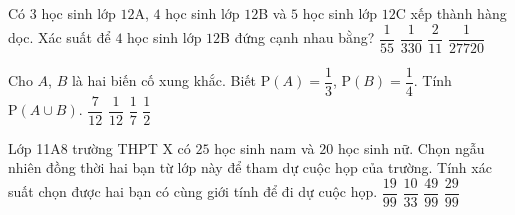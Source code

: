 \begin{ex}%
	Có $ 3 $ học sinh lớp $ 12 $A, $ 4 $ học sinh lớp $ 12 $B và $ 5 $ học  sinh lớp $ 12 $C xếp thành hàng dọc. Xác suất để $ 4 $ học sinh lớp $ 12 $B đứng cạnh nhau bằng?
	\choice 
		{\True  $ \dfrac{1}{55} $}
		{$  \dfrac{1}{330} $}
		 {$ \dfrac{2}{11} $}
		 {$ \dfrac{1}{ 27720 } $}
\end{ex}

\begin{ex}%
	Cho $A$, $B$ là hai biến cố xung khắc.  Biết $\mathrm{P}(A)=\dfrac{1}{3}$, $\mathrm{P}(B)=\dfrac{1}{4}$. Tính $\mathrm{P}(A\cup B)$.
	 \choice
		{\True  $\dfrac{7}{12}$}
		{$\dfrac{1}{12}$} 
		{$\dfrac{1}{7}$} 
		 {$\dfrac{1}{2}$}
\end{ex}

\begin{ex}%
	Lớp 11A8 trường THPT X có $25$ học sinh nam và $20$ học sinh nữ. Chọn ngẫu nhiên đồng thời hai bạn từ lớp này để tham dự cuộc họp của trường. Tính xác suất chọn được hai bạn có cùng giới tính để đi dự  cuộc họp.
	\choice 
		{$\dfrac{19}{99}$} 
		{$\dfrac{10}{33}$} 
		{\True $\dfrac{49}{99}$} 
		{$\dfrac{29}{99}$} 
\end{ex}

